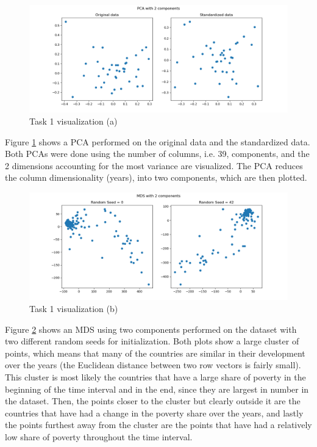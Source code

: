 \documentclass[11pt,a4paper,titlepage]{article}
\begin{document}
\begin{figure}[h!]
    \centering
    \includegraphics[width=1.0\linewidth]{reports/assignment-4/imgs/pca.png}
    \caption{Task 1 visualization (a)}
    \label{fig:pca}
\end{figure}

Figure \ref{fig:pca} shows a PCA performed on the original data and the standardized data. Both PCAs were done using the number of columns, i.e. 39, components, and the 2 dimensions accounting for the most variance are visualized. The PCA reduces the column dimensionality (years), into two components, which are then plotted.

\begin{figure}[h!]
    \centering
    \includegraphics[width=1.0\linewidth]{reports/assignment-4/imgs/mds.png}
    \caption{Task 1 visualization (b)}
    \label{fig:mds}
\end{figure}

\newpage

Figure \ref{fig:mds} shows an MDS using two components performed on the dataset with two different random seeds for initialization. Both plots show a large cluster of points, which means that many of the countries are similar in their development over the years (the Euclidean distance between two row vectors is fairly small). This cluster is most likely the countries that have a large share of poverty in the beginning of the time interval and in the end, since they are largest in number in the dataset. Then, the points closer to the cluster but clearly outside it are the countries that have had a change in the poverty share over the years, and lastly the points furthest away from the cluster are the points that have had a relatively low share of poverty throughout the time interval.
\end{document}

